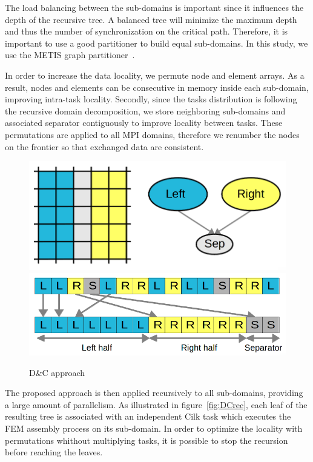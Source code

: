 \documentclass[10pt]{IOS-Book-Article}
\begin{document}
The load balancing between the sub-domains is important since it influences the depth of the recursive tree.
A balanced tree will minimize the maximum depth and thus the number of synchronization on the critical path.
Therefore, it is important to use a good partitioner to build equal sub-domains. In this study, we use the METIS graph partitioner~\cite{Metis}.

In order to increase the data locality, we permute node and element arrays.
As a result, nodes and elements can be consecutive in memory inside each sub-domain, improving intra-task locality.
Secondly, since the tasks distribution is following the recursive domain decomposition, we store neighboring sub-domains and associated separator contiguously
to improve locality between tasks.
These permutations are applied to all MPI domains, therefore we renumber the nodes on the frontier so that exchanged data are consistent.
\begin{figure}[htp]
 \centering
 \includegraphics[scale=0.17]{DC_approach.png}
 \includegraphics[scale=0.21]{Data_permutations.png}
 \caption{D\&C approach}
 \label{fig:DCapp}
\end{figure}

The proposed approach is then applied recursively to all sub-domains, providing a large amount of parallelism.
As illustrated in figure~\ref{fig:DCrec}, each leaf of the resulting tree is associated with an independent Cilk task which executes the FEM assembly process on its sub-domain.
In order to optimize the locality with permutations whithout multiplying tasks, it is possible to stop the recursion before reaching the leaves.
\end{document}
